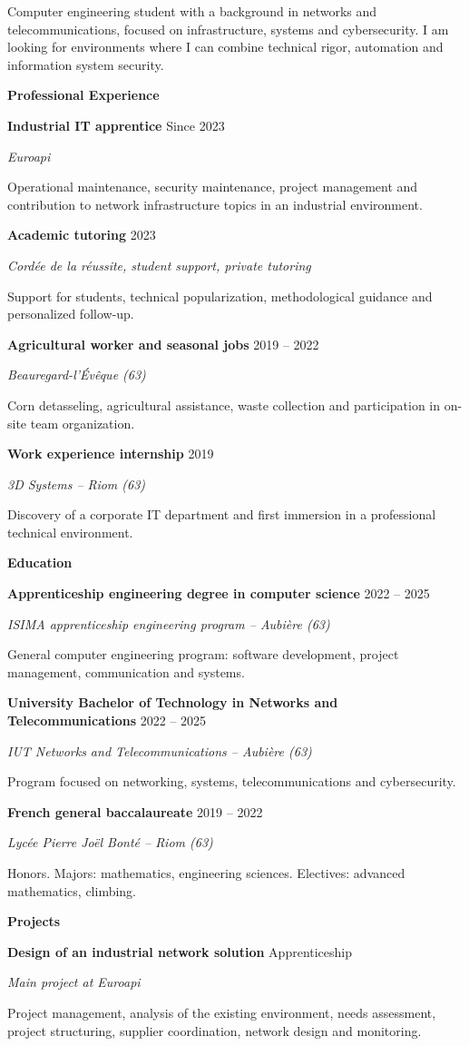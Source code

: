 \documentclass[10pt,a4paper]{article}
\newcommand{\sectiontitle}[1]{%
  \vspace{0.68em}%
  \noindent{\color{PortfolioBorder}\rule{\linewidth}{0.8pt}}\par
  \vspace{0.95em}%
  {\headingfont\fontsize{13.5}{13.5}\selectfont\bfseries\color{PortfolioAccent} #1}\par
  \vspace{0.32em}%
}
\newcommand{\cventry}[4]{%
  {\fontsize{10.2}{10.8}\selectfont\bfseries\color{PortfolioSoft} #1}\hfill{\fontsize{9.5}{10}\selectfont\color{PortfolioAccent} #2}\par
  {\fontsize{9.4}{10.2}\selectfont\itshape\color{PortfolioText} #3}\par
  {\fontsize{9.15}{10.8}\selectfont\color{PortfolioMuted} #4}\par
  \vspace{0.58em}
}
\begin{document}
\begin{minipage}[t]{0.64\textwidth}
  \vspace{0pt}
  {\fontsize{11.6}{14.2}\selectfont\color{PortfolioSoft}
  Computer engineering student with a background in networks and telecommunications, focused on infrastructure, systems and cybersecurity. I am looking for environments where I can combine technical rigor, automation and information system security.}

  \vspace{0.45em}

  \sectiontitle{Professional Experience}
  \cventry
    {Industrial IT apprentice}
    {Since 2023}
    {Euroapi}
    {Operational maintenance, security maintenance, project management and contribution to network infrastructure topics in an industrial environment.}

  \cventry
    {Academic tutoring}
    {2023}
    {Cord\'ee de la r\'eussite, student support, private tutoring}
    {Support for students, technical popularization, methodological guidance and personalized follow-up.}

  \cventry
    {Agricultural worker and seasonal jobs}
    {2019 -- 2022}
    {Beauregard-l'\'Ev\^eque (63)}
    {Corn detasseling, agricultural assistance, waste collection and participation in on-site team organization.}

  \cventry
    {Work experience internship}
    {2019}
    {3D Systems -- Riom (63)}
    {Discovery of a corporate IT department and first immersion in a professional technical environment.}

  \sectiontitle{Education}
  \cventry
    {Apprenticeship engineering degree in computer science}
    {2022 -- 2025}
    {ISIMA apprenticeship engineering program -- Aubi\`ere (63)}
    {General computer engineering program: software development, project management, communication and systems.}

  \cventry
    {University Bachelor of Technology in Networks and Telecommunications}
    {2022 -- 2025}
    {IUT Networks and Telecommunications -- Aubi\`ere (63)}
    {Program focused on networking, systems, telecommunications and cybersecurity.}

  \cventry
    {French general baccalaureate}
    {2019 -- 2022}
    {Lyc\'ee Pierre Jo\"el Bont\'e -- Riom (63)}
    {Honors. Majors: mathematics, engineering sciences. Electives: advanced mathematics, climbing.}

  \sectiontitle{Projects}
  \cventry
    {Design of an industrial network solution}
    {Apprenticeship}
    {Main project at Euroapi}
    {Project management, analysis of the existing environment, needs assessment, project structuring, supplier coordination, network design and monitoring.}


\end{minipage}
\end{document}
